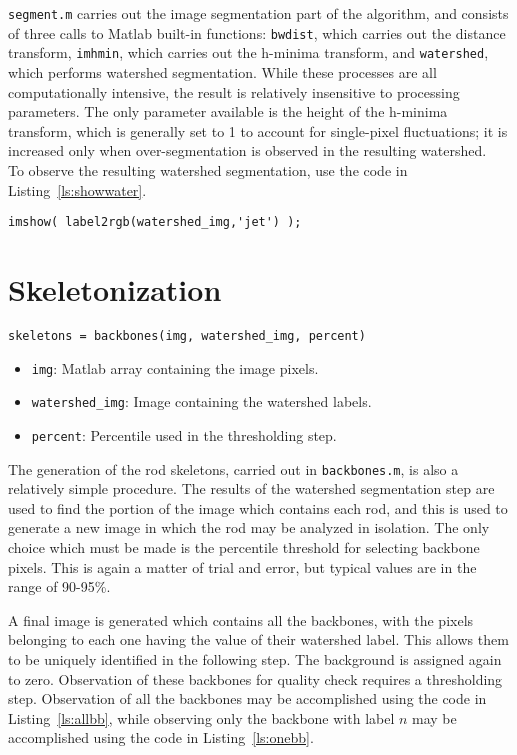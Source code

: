 \texttt{segment.m} carries out the image segmentation part of the algorithm, and consists of three calls to
Matlab built-in functions: \texttt{bwdist}, which carries out the distance transform, 
\texttt{imhmin}, which carries out the h-minima transform, and \texttt{watershed}, which performs watershed
segmentation. While these processes are all computationally intensive, the result is relatively insensitive to
processing parameters. The only parameter available is the height of the h-minima transform, which is generally
set to 1 to account for single-pixel fluctuations; 
it is increased only when over-segmentation is observed in the resulting watershed.~\cite{matlab-watershed}
To observe the resulting watershed segmentation, use the code in Listing~\ref{ls:showwater}.

\begin{lstlisting}[label=ls:showwater,caption=Observe watershed segmentation]
imshow( label2rgb(watershed_img,'jet') );
\end{lstlisting}

\section{Skeletonization}

\texttt{skeletons = backbones(img, watershed\_img, percent)}

\begin{itemize}
\item \texttt{img}: Matlab array containing the image pixels.
\item \texttt{watershed\_img}: Image containing the watershed labels.
\item \texttt{percent}: Percentile used in the thresholding step.
\end{itemize}

The generation of the rod skeletons, carried out in \texttt{backbones.m}, is also a relatively simple
procedure.  The results of the watershed segmentation step are used to find the portion of the 
image which contains each rod, and this is used to generate a new image in which the rod may
be analyzed in isolation. The only choice which must be made is the percentile threshold for selecting 
backbone pixels. This is again a matter of trial and error, but typical values are in the range of 90-95\%.

A final image is generated which contains all the backbones, with the pixels belonging to each one having
the value of their watershed label. This allows them to be uniquely identified in the following step. The background is 
assigned again to zero.  Observation of these backbones for quality check requires a thresholding step. Observation
of all the backbones may be accomplished using the code in Listing~\ref{ls:allbb}, while observing only the backbone 
with label $n$ may be accomplished using the code in Listing~\ref{ls:onebb}.

